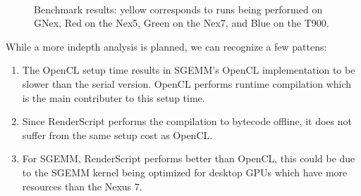 \begin{figure}
    ~
    \\
    \caption{Benchmark results: yellow corresponds to runs being performed on GNex, Red on the Nex5, Green on the Nex7, and Blue on the T900.}%
    \label{fig:benchmarks}%
\end{figure}

While a more indepth analysis is planned, we can recognize a few pattens:

\begin{enumerate}
\item The OpenCL setup time results in SGEMM's OpenCL implementation to be slower than the serial version. OpenCL performs runtime compilation which is the main contributer to this setup time.
\item Since RenderScript performs the compilation to bytecode offline, it does not suffer from the same setup cost as OpenCL.
\item For SGEMM, RenderScript performs better than OpenCL, this could be due
  to the SGEMM kernel being optimized for desktop GPUs which have more resources than the Nexus 7. 
\end{enumerate}
